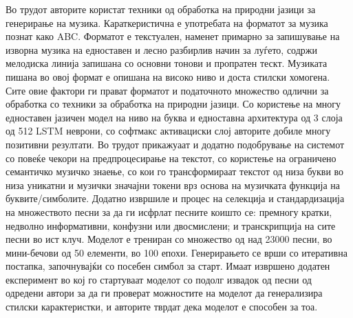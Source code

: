 Во трудот \cite{Sturm2016} авторите користат техники од обработка на природни јазици за генерирање на музика. Караткеристична е употребата на форматот за музика познат како ABC. Форматот е текстуален, наменет примарно за запишување на изворна музика на едноставен и лесно разбирлив начин за луѓето, содржи мелодиска линија запишана со основни тонови и пропратен тескт. Музиката пишана во овој формат е опишана на високо ниво и доста стилски хомогена. Сите овие фактори ги прават форматот и податочното множество одлични за обработка со техники за обработка на природни јазици. Со користење на многу едноставен јазичен модел на ниво на буква и едноставна архитектура од 3 слоја од 512 LSTM неврони, со софтмакс активациски слој авторите добиле многу позитивни резултати. Во трудот прикажуаат и додатно подобрување на системот со повеќе чекори на предпроцесирање на текстот, со користење на ограничено семантичко музичко знаење, со кои го трансформираат текстот од низа букви во низа уникатни и музички значајни токени врз основа на музичката функција на буквите/симболите. Додатно извршиле и процес на селекција и стандардизација на множеството песни за да ги исфрлат песните коишто се: премногу кратки, недволно информативни, конфузни или двосмислени; и транскрипција на сите песни во ист клуч. Моделот е трениран со множество од над 23000 песни, во мини-бечови од 50 елементи, во 100 епохи. Генерирањето се врши со итеративна постапка, започнувајќи со посебен симбол за старт. Имаат извршено додатен експеримент во кој го стартуваат моделот со подолг извадок од песни од одредени автори за да ги проверат можностите на моделот да генерализира стилски карактеристки, и авторите тврдат дека моделот е способен за тоа.

